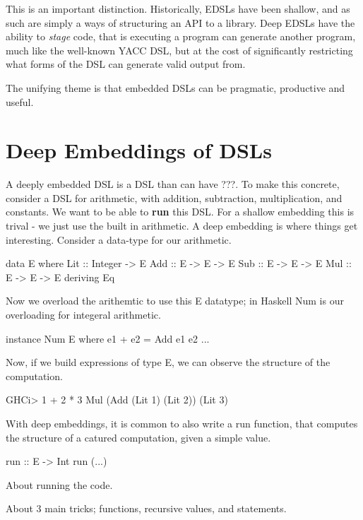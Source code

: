 \documentclass[11pt]{article}
\begin{document}
This is an important distinction. Historically, EDSLs have been shallow,
and as such are simply a ways of structuring an API to a library. Deep EDSLs
have the ability to {\em stage\/} code, that is executing a program
can generate another program, much like the well-known YACC DSL,
but at the cost of significantly restricting what forms of the DSL can
generate valid output from.

The unifying theme is that embedded DSLs can
be pragmatic, productive and useful. 

\section{Deep Embeddings of DSLs}

A deeply embedded DSL is a DSL than can have ???.
To make this concrete, consider a DSL for arithmetic,
with addition, subtraction, multiplication, and constants.
We want to be able to {\bf run\/} this DSL. For a shallow
embedding this is trival - we just use the built in 
arithmetic. A deep embedding is where things get
interesting. Consider a data-type for our arithmetic.

\begin{Code}
data E where
 Lit :: Integer  -> E
 Add :: E -> E -> E
 Sub :: E -> E -> E
 Mul :: E -> E -> E
 deriving Eq
\end{Code}

Now we overload the arithemtic to use this E datatype;
in Haskell Num is our overloading for integeral arithmetic.

\begin{Code}
instance Num E where
  e1 + e2 = Add e1 e2
  ...
  
\end{Code}

Now, if we build expressions of type E, we can
observe the structure of the computation.
\begin{SemiCode}
GHCi> 1 + 2 * 3
Mul (Add (Lit 1) (Lit 2)) (Lit 3)
\end{SemiCode}

With deep embeddings, it is common to also
write a run function, that computes the structure
of a catured computation, given a simple value.
\begin{Code}
run :: E -> Int
run (...)
\end{Code}

About running the code.

About 3 main tricks; functions, recursive values, and statements.
\end{document}
